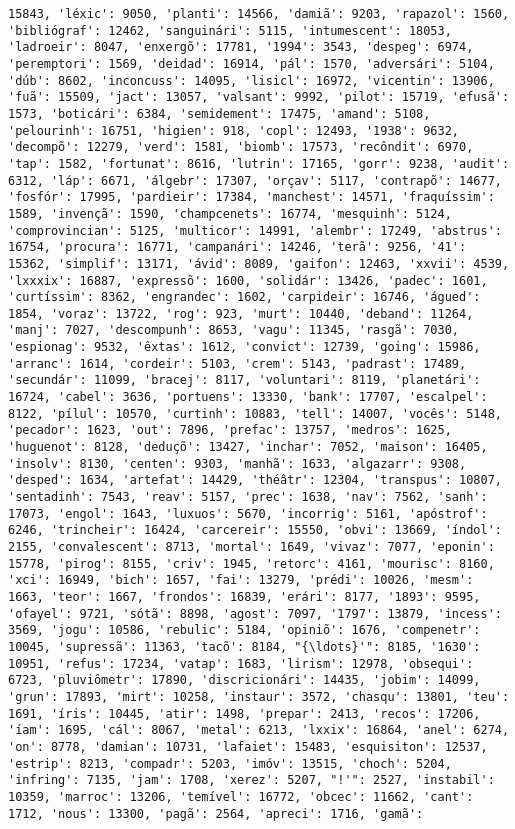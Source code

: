 \documentclass[11pt]{article}
\begin{document}
\begin{Verbatim}[commandchars=\\\{\}]
15843, 'léxic': 9050, 'planti': 14566, 'damiã': 9203, 'rapazol': 1560, 'bibliógraf': 12462, 'sanguinári': 5115, 'intumescent': 18053, 'ladroeir': 8047, 'enxergõ': 17781, '1994': 3543, 'despeg': 6974, 'peremptori': 1569, 'deidad': 16914, 'pál': 1570, 'adversári': 5104, 'dúb': 8602, 'inconcuss': 14095, 'lisicl': 16972, 'vicentin': 13906, 'fuã': 15509, 'jact': 13057, 'valsant': 9992, 'pilot': 15719, 'efusã': 1573, 'boticári': 6384, 'semidement': 17475, 'amand': 5108, 'pelourinh': 16751, 'higien': 918, 'copl': 12493, '1938': 9632, 'decompõ': 12279, 'verd': 1581, 'biomb': 17573, 'recôndit': 6970, 'tap': 1582, 'fortunat': 8616, 'lutrin': 17165, 'gorr': 9238, 'audit': 6312, 'láp': 6671, 'álgebr': 17307, 'orçav': 5117, 'contrapõ': 14677, 'fosfór': 17995, 'pardieir': 17384, 'manchest': 14571, 'fraquíssim': 1589, 'invençã': 1590, 'champcenets': 16774, 'mesquinh': 5124, 'comprovincian': 5125, 'multicor': 14991, 'alembr': 17249, 'abstrus': 16754, 'procura': 16771, 'campanári': 14246, 'terã': 9256, '41': 15362, 'simplif': 13171, 'ávid': 8089, 'gaifon': 12463, 'xxvii': 4539, 'lxxxix': 16887, 'expressõ': 1600, 'solidár': 13426, 'padec': 1601, 'curtíssim': 8362, 'engrandec': 1602, 'carpideir': 16746, 'águed': 1854, 'voraz': 13722, 'rog': 923, 'murt': 10440, 'deband': 11264, 'manj': 7027, 'descompunh': 8653, 'vagu': 11345, 'rasgã': 7030, 'espionag': 9532, 'êxtas': 1612, 'convict': 12739, 'going': 15986, 'arranc': 1614, 'cordeir': 5103, 'crem': 5143, 'padrast': 17489, 'secundár': 11099, 'bracej': 8117, 'voluntari': 8119, 'planetári': 16724, 'cabel': 3636, 'portuens': 13330, 'bank': 17707, 'escalpel': 8122, 'pílul': 10570, 'curtinh': 10883, 'tell': 14007, 'vocês': 5148, 'pecador': 1623, 'out': 7896, 'prefac': 13757, 'medros': 1625, 'huguenot': 8128, 'deduçõ': 13427, 'inchar': 7052, 'maison': 16405, 'insolv': 8130, 'centen': 9303, 'manhã': 1633, 'algazarr': 9308, 'desped': 1634, 'artefat': 14429, 'théâtr': 12304, 'transpus': 10807, 'sentadinh': 7543, 'reav': 5157, 'prec': 1638, 'nav': 7562, 'sanh': 17073, 'engol': 1643, 'luxuos': 5670, 'incorrig': 5161, 'apóstrof': 6246, 'trincheir': 16424, 'carcereir': 15550, 'obvi': 13669, 'índol': 2155, 'convalescent': 8713, 'mortal': 1649, 'vivaz': 7077, 'eponin': 15778, 'pirog': 8155, 'criv': 1945, 'retorc': 4161, 'mourisc': 8160, 'xci': 16949, 'bich': 1657, 'fai': 13279, 'prédi': 10026, 'mesm': 1663, 'teor': 1667, 'frondos': 16839, 'erári': 8177, '1893': 9595, 'ofayel': 9721, 'sótã': 8898, 'agost': 7097, '1797': 13879, 'incess': 3569, 'jogu': 10586, 'rebulic': 5184, 'opiniõ': 1676, 'compenetr': 10045, 'supressã': 11363, 'tacõ': 8184, "{\ldots}'": 8185, '1630': 10951, 'refus': 17234, 'vatap': 1683, 'lirism': 12978, 'obsequi': 6723, 'pluviômetr': 17890, 'discricionári': 14435, 'jobim': 14099, 'grun': 17893, 'mirt': 10258, 'instaur': 3572, 'chasqu': 13801, 'teu': 1691, 'íris': 10445, 'atir': 1498, 'prepar': 2413, 'recos': 17206, 'íam': 1695, 'cál': 8067, 'metal': 6213, 'lxxix': 16864, 'anel': 6274, 'on': 8778, 'damian': 10731, 'lafaiet': 15483, 'esquisiton': 12537, 'estrip': 8213, 'compadr': 5203, 'imóv': 13515, 'choch': 5204, 'infring': 7135, 'jam': 1708, 'xerez': 5207, "!'": 2527, 'instabil': 10359, 'marroc': 13206, 'temível': 16772, 'obcec': 11662, 'cant': 1712, 'nous': 13300, 'pagã': 2564, 'apreci': 1716, 'gamã': 
\end{Verbatim}
\end{document}
